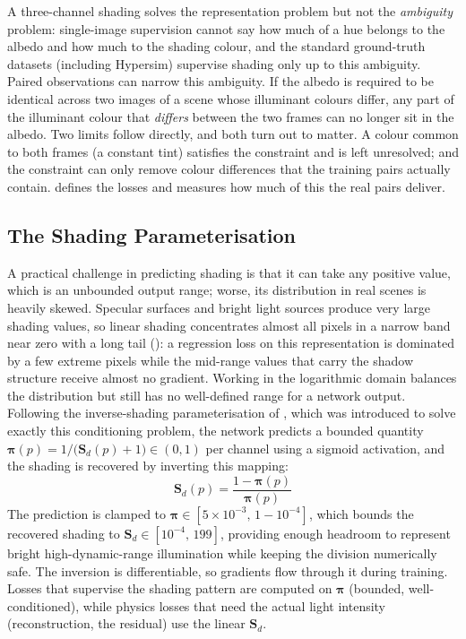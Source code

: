 A three-channel shading solves the representation problem but not the
\emph{ambiguity} problem: single-image supervision cannot say how much of a hue
belongs to the albedo and how much to the shading colour, and the standard
ground-truth datasets (including Hypersim) supervise shading only up to this
ambiguity.
Paired observations can narrow this ambiguity. If the albedo is required to be
identical across two images of a scene whose illuminant colours differ, any part of the
illuminant colour that \emph{differs} between the two frames can no longer sit in the
albedo. Two limits follow directly, and both turn out to matter. A colour common to both
frames (a constant tint) satisfies the constraint and is left unresolved; and the
constraint can only remove colour differences that the training pairs actually contain.
 defines the losses and  measures how much of
this the real pairs deliver.

\subsection{The Shading Parameterisation}

A practical challenge in predicting shading is that it can take any positive
value, which is an unbounded output range; worse, its distribution in
real scenes is heavily skewed.
Specular surfaces and bright light sources produce very large shading values,
so linear shading concentrates almost all pixels in a narrow band near zero
with a long tail (): a regression loss on this
representation is dominated by a few extreme pixels while the mid-range
values that carry the shadow structure receive almost no gradient.
Working in the logarithmic domain balances the distribution but still has no
well-defined range for a network output.
Following the inverse-shading parameterisation of ,
which was introduced to solve exactly this conditioning problem,
the network predicts a bounded quantity
$\boldsymbol{\pi}(p) = 1 / \bigl(\mathbf{S}_d(p) + 1\bigr) \in (0, 1)$
per channel using a sigmoid activation, and the shading is recovered by
inverting this mapping:
\begin{equation}
  \mathbf{S}_d(p) = \frac{1 - \boldsymbol{\pi}(p)}{\boldsymbol{\pi}(p)}
  \label{eq:uninvert}
\end{equation}
The prediction is clamped to
$\boldsymbol{\pi} \in [5 \times 10^{-3},\, 1 - 10^{-4}]$, which bounds the
recovered shading to $\mathbf{S}_d \in [10^{-4},\, 199]$, providing enough headroom to
represent bright high-dynamic-range illumination while keeping the division
numerically safe.
The inversion is differentiable, so gradients flow through it during training.
Losses that supervise the shading pattern are computed on $\boldsymbol{\pi}$
(bounded, well-conditioned), while physics losses that need the actual light
intensity (reconstruction, the residual) use the linear $\mathbf{S}_d$.

